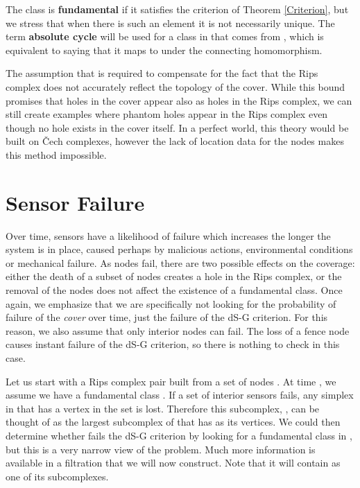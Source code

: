 \documentclass[10pt,twocolumn]{article} \usepackage{amsmath,epsf,amssymb,cite,pifont,amsthm, mathrsfs,epsfig,  bbm, amsthm,  setspace}
\renewcommand{\1}{\mathbbm{1}}
\newcommand{\Cech}{\v{C}ech }
\begin{document}
The class  is \textbf{fundamental} if it satisfies the criterion of
Theorem \ref{Criterion},
but we stress that when there is such an element it is not necessarily unique.
The term \textbf{absolute cycle} will be used for a class in  that comes
from , which is equivalent to saying that it maps to 
under the connecting homomorphism.

The assumption that  is required to compensate for the fact that the Rips complex
does not accurately reflect the topology of the cover.
While this bound promises that holes in the cover appear also as holes in the Rips complex,
we can still create examples where phantom holes appear in the Rips complex even though no hole exists in the cover itself.
In a perfect world, this theory would be built on \Cech complexes,
however the lack of location data for the nodes makes this method impossible.







\section{Sensor Failure} \label{S: Sensor Failure}
Over time, sensors have a likelihood of failure which increases the longer the system is in place,
caused perhaps by malicious actions, environmental conditions or mechanical failure.
As nodes fail, there are two possible effects on the coverage:
either the death of a subset of nodes
creates a hole in the Rips complex,
or the removal of the nodes does not affect the existence of a fundamental class.
Once again, we emphasize
 that we are specifically not looking for the probability of failure of the \textit{cover}
over time, just the failure of the dS-G criterion.
For this reason, we also assume that only interior nodes can fail.
The loss of a fence node causes instant failure of the dS-G criterion,
so there is nothing to check in this case.

Let us start with a Rips complex pair  built from a set of nodes .
At time , we assume we have a fundamental class .
If a set of interior sensors  fails, any simplex in 
that has a vertex in the set  is lost.
Therefore this subcomplex, , can be thought of as the largest subcomplex of  that has
  as its vertices.
We could then determine whether  fails the dS-G criterion by looking for a fundamental class in
, but this is a very narrow view of the problem.
Much more information is available in a filtration that we will now construct.
Note that it will  contain  as one of its subcomplexes.
\end{document}
